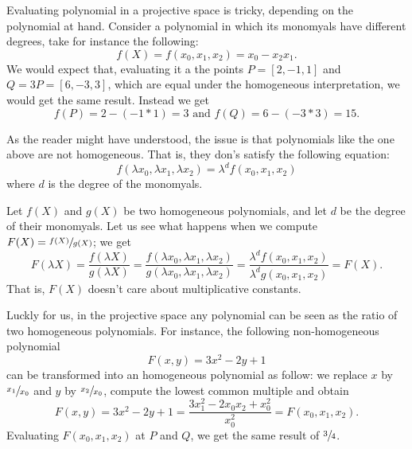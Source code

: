 \documentclass{subfiles}
\begin{document}
    Evaluating polynomial in a projective space is tricky, 
        depending on the polynomial at hand.
        Consider a polynomial in which its monomyals have different degrees,
        take for instance the following:
        \[
            f(X) = f(x_{0}, x_{1}, x_{2}) = x_{0} - x_{2}x_{1}.
        \]
        We would expect that, evaluating it a the points \(P = [2, -1, 1]\) and \(Q = 3P = [6, -3, 3]\),
        which are equal under the homogeneous interpretation,
        we would get the same result.
        Instead we get 
        \[
            f(P) = 2 - (-1 * 1) = 3 \text{ and } f(Q) = 6 - (-3 * 3) = 15.
        \]

    As the reader might have understood, the issue is that polynomials like the one above 
        are not homogeneous. That is, they don's satisfy the following equation:
        \[
            f(\lambda x_{0}, \lambda x_{1}, \lambda x_{2}) = \lambda^{d} f(x_{0}, x_{1}, x_{2})
        \]
        where \(d\) is the degree of the monomyals.
    
    Let \(f(X)\) and \(g(X)\) be two homogeneous polynomials,
        and let \(d\) be the degree of their monomyals.
        Let us see what happens when we compute \(F(X) = \sfrac{f(X)}{g(X)}\);
        we get 
        \[
            F(\lambda X) = \frac{f(\lambda X)}{g(\lambda X)} = 
                \frac{f(\lambda x_{0}, \lambda x_{1}, \lambda x_{2})}{g(\lambda x_{0}, \lambda x_{1}, \lambda x_{2})} = 
                \frac{\lambda^{d} f(x_{0}, x_{1}, x_{2})}{\lambda^{d} g(x_{0}, x_{1}, x_{2})} = 
                F(X).
        \]
        That is, \(F(X)\) doesn't care about multiplicative constants.

    Luckly for us, in the projective space 
        any polynomial can be seen as the ratio of two homogeneous polynomials.
        For instance, the following non-homogeneous polynomial
        \[
            F(x, y) = 3x^{2} -2y + 1 
        \]
        can be transformed into an homogeneous polynomial as follow:
        we replace \(x\) by \(\sfrac{x_{1}}{x_{0}}\) and \(y\) by \(\sfrac{x_{2}}{x_{0}}\),
        compute the lowest common multiple and obtain
        \[
            F(x, y) = 3x^{2} - 2y + 1 = \frac{3x_{1}^{2} - 2x_{0}x_{2} + x_{0}^{2}}{x_{0}^{2}} = F(x_{0}, x_{1}, x_{2}).
        \]
        Evaluating \(F(x_{0}, x_{1}, x_{2})\) at \(P\) and \(Q\), we get the same result of \(\sfrac{3}{4}\).
\end{document}
